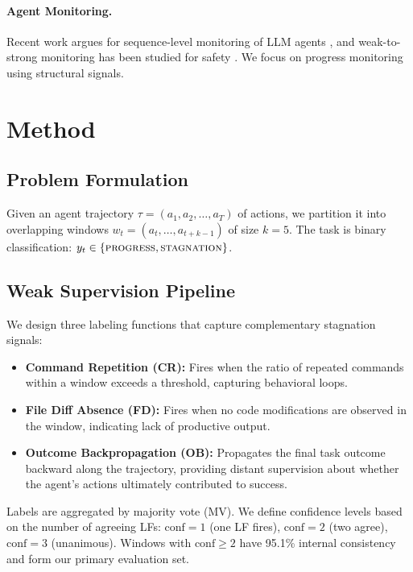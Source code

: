 \documentclass[11pt,a4paper]{article}
\begin{document}
\paragraph{Agent Monitoring.}
Recent work argues for sequence-level monitoring of LLM agents \cite{agentmonitor2025iclr}, and weak-to-strong monitoring has been studied for safety \cite{weakstrong2025}.
We focus on progress monitoring using structural signals.


\section{Method}
\label{sec:method}

\subsection{Problem Formulation}

Given an agent trajectory $\tau = (a_1, a_2, \ldots, a_T)$ of actions, we partition it into overlapping windows $w_t = (a_t, \ldots, a_{t+k-1})$ of size $k{=}5$.
The task is binary classification: $y_t \in \{\textsc{progress}, \textsc{stagnation}\}$.

\subsection{Weak Supervision Pipeline}

We design three labeling functions that capture complementary stagnation signals:

\begin{itemize}
\item \textbf{Command Repetition (CR):} Fires when the ratio of repeated commands within a window exceeds a threshold, capturing behavioral loops.
\item \textbf{File Diff Absence (FD):} Fires when no code modifications are observed in the window, indicating lack of productive output.
\item \textbf{Outcome Backpropagation (OB):} Propagates the final task outcome backward along the trajectory, providing distant supervision about whether the agent's actions ultimately contributed to success.
\end{itemize}

Labels are aggregated by majority vote (MV). We define confidence levels based on the number of agreeing LFs: $\text{conf}{=}1$ (one LF fires), $\text{conf}{=}2$ (two agree), $\text{conf}{=}3$ (unanimous). Windows with $\text{conf}{\geq}2$ have 95.1\% internal consistency and form our primary evaluation set.
\end{document}
